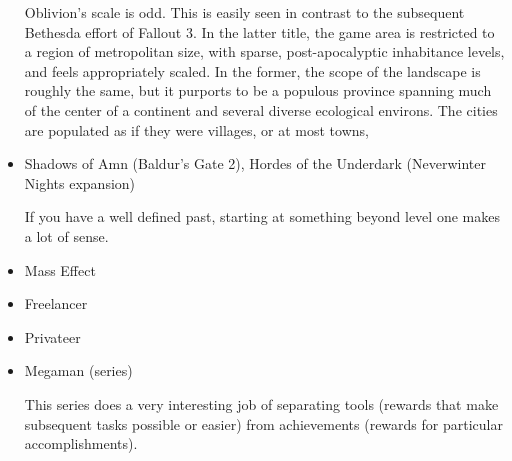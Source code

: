 \begin{itemize}
Oblivion's scale is odd. This is easily seen in contrast to the
subsequent Bethesda effort of Fallout 3. In the latter title, the game
area is restricted to a region of metropolitan size, with sparse,
post-apocalyptic inhabitance levels, and feels appropriately
scaled. In the former, the scope of the landscape is roughly the same,
but it purports to be a populous province spanning much of the center
of a continent and several diverse ecological environs. The cities are
populated as if they were villages, or at most towns,

\item Shadows of Amn (Baldur's Gate 2), Hordes of the Underdark (Neverwinter Nights expansion)

If you have a well defined past, starting at something beyond level
one makes a lot of sense.

\item Mass Effect

\item Freelancer

\item Privateer

\item Megaman (series)

This series does a very interesting job of separating tools (rewards that make subsequent tasks possible or easier) from achievements (rewards for particular accomplishments).

\end{itemize}


